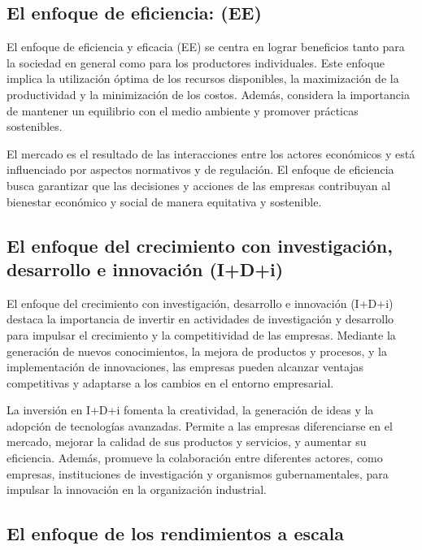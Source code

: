 \documentclass[
  doc,
  floatsintext,
  longtable,
  a4paper,
  nolmodern,
  notxfonts,
  notimes,
  colorlinks=true,linkcolor=blue,citecolor=blue,urlcolor=blue]{apa7}
\begin{document}
\subsection{El enfoque de eficiencia:
(EE)}\label{el-enfoque-de-eficiencia-ee}

El enfoque de eficiencia y eficacia (EE) se centra en lograr beneficios
tanto para la sociedad en general como para los productores
individuales. Este enfoque implica la utilización óptima de los recursos
disponibles, la maximización de la productividad y la minimización de
los costos. Además, considera la importancia de mantener un equilibrio
con el medio ambiente y promover prácticas sostenibles.

El mercado es el resultado de las interacciones entre los actores
económicos y está influenciado por aspectos normativos y de regulación.
El enfoque de eficiencia busca garantizar que las decisiones y acciones
de las empresas contribuyan al bienestar económico y social de manera
equitativa y sostenible.

\subsection{El enfoque del crecimiento con investigación, desarrollo e
innovación
(I+D+i)}\label{el-enfoque-del-crecimiento-con-investigaciuxf3n-desarrollo-e-innovaciuxf3n-idi}

El enfoque del crecimiento con investigación, desarrollo e innovación
(I+D+i) destaca la importancia de invertir en actividades de
investigación y desarrollo para impulsar el crecimiento y la
competitividad de las empresas. Mediante la generación de nuevos
conocimientos, la mejora de productos y procesos, y la implementación de
innovaciones, las empresas pueden alcanzar ventajas competitivas y
adaptarse a los cambios en el entorno empresarial.

La inversión en I+D+i fomenta la creatividad, la generación de ideas y
la adopción de tecnologías avanzadas. Permite a las empresas
diferenciarse en el mercado, mejorar la calidad de sus productos y
servicios, y aumentar su eficiencia. Además, promueve la colaboración
entre diferentes actores, como empresas, instituciones de investigación
y organismos gubernamentales, para impulsar la innovación en la
organización industrial.

\subsection{El enfoque de los rendimientos a
escala}\label{el-enfoque-de-los-rendimientos-a-escala}
\end{document}
